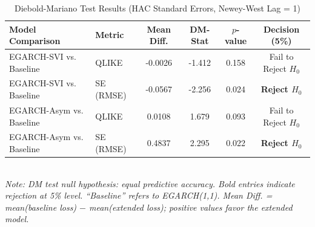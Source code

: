 \begin{table}[H]
\centering
\caption{Diebold-Mariano Test Results (HAC Standard Errors, Newey-West Lag = 1)}
\label{tab:dm}
\small
\begin{tabular}{llcccc}
\toprule
Model Comparison & Metric & Mean Diff. & DM-Stat & $p$-value & Decision (5\%) \\
\midrule
        EGARCH-SVI vs. Baseline & QLIKE & -0.0026 & -1.412 & 0.158 & Fail to Reject $H_0$ \\
        EGARCH-SVI vs. Baseline & SE (RMSE) & -0.0567 & -2.256 & 0.024 & \textbf{Reject $H_0$} \\
        EGARCH-Asym vs. Baseline & QLIKE & 0.0108 & 1.679 & 0.093 & Fail to Reject $H_0$ \\
        EGARCH-Asym vs. Baseline & SE (RMSE) & 0.4837 & 2.295 & 0.022 & \textbf{Reject $H_0$} \\
\bottomrule
\end{tabular}
\smallskip\\
\footnotesize\textit{Note: DM test null hypothesis: equal predictive accuracy. Bold entries indicate rejection at 5\% level. ``Baseline'' refers to EGARCH(1,1). Mean Diff. = mean(baseline loss) $-$ mean(extended loss); positive values favor the extended model.}
\end{table}